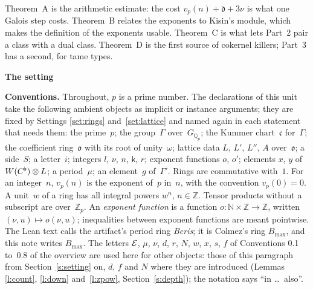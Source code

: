 \documentclass[11pt,a4paper]{article}
\newcommand{\kw}[1]{\emph{#1}}
\newcommand{\m}[1]{\mbox{$#1$}}        %
\newcommand{\sect}[2]{\refstepcounter{section}\label{#2}\par\addvspace{19pt plus 4pt minus 2pt}\Needspace{7\baselineskip}%
  \noindent\llap{{\fontsize{13.2}{16}\selectfont\bfseries\color{inkfaint}\thesection}\hspace{9pt}}%
  {\fontsize{13.2}{16}\selectfont\bfseries\color{ink}#1}\par\nopagebreak\vspace{-1pt}}
\theoremstyle{plainx}
\theoremstyle{uprightx}
\newenvironment{conventions}{\par\addvspace{5pt}\noindent\textbf{Conventions.}\enspace\ignorespaces}{\par\addvspace{3pt}}
\providecommand{\Zp}{\mathbb{Z}_p}\providecommand{\Qp}{\mathbb{Q}_p}\providecommand{\GQp}{G_{\mathbb{Q}_p}}
\providecommand{\fo}{\mathfrak{o}}\providecommand{\fc}{\mathfrak{c}}\providecommand{\fd}{\mathfrak{d}}
\begin{document}
Theorem~A is the arithmetic estimate: the cost \m{v_p(n)+\fd+3\nu} is what one Galois step costs. Theorem~B relates
the exponents to Kisin's module, which makes the definition of the exponents usable. Theorem~C is
what lets Part~2 pair a class with a dual class. Theorem~D is the first source of cokernel killers; Part~3 has a
second, for tame types.

\sect{The setting}{s:setting}
\begin{conventions}\label{c:conventions}
Throughout, $p$ is a prime number. The declarations of this unit take the following ambient objects as implicit or
instance arguments; they are fixed by Settings \ref{set:rings} and~\ref{set:lattice} and named again in each
statement that needs them: the prime~$p$; the group~$\Gamma$ over~$\GQp$; the Kummer chart~$\fc$ for~$\Gamma$; the
coefficient ring~$\fo$ with its root of unity~$\omega$; lattice data $L$, $L'$, $L''$, $A$ over~$\fo$; a side~$S$; a
letter~$i$; integers $l$, $\nu$, $n$, $\mathsf{k}$, $r$; exponent functions $o$, $o'$; elements $x$, $y$ of
\m{\WC\otimes L}; a period~$\mu$; an element~$g$ of~$\Gamma'$. Rings are commutative with~$1$. For an
integer~$n$, \m{v_p(n)} is the exponent of~$p$ in~$n$, with the convention \m{v_p(0)=0}. A unit~$w$ of a ring
has all integral powers \m{w^{n}}, \m{n\in\mathbb{Z}}. Tensor products without a subscript are over~$\Zp$. An
\kw{exponent function} is a function $o\colon\mathbb{N}\times\mathbb{Z}\to\mathbb{Z}$, written
\m{(\nu,u)\mapsto o(\nu,u)}; inequalities between exponent functions are meant pointwise. The Lean text calls
the artifact's period ring \emph{Bcris}; it is Colmez's ring $B_{\max}$, and this note writes $B_{\max}$. The letters $\mathcal{E}$, $\mu$, $\nu$, $d$, $r$, $N$, $w$, $x$, $s$, $f$ of Conventions 0.1 to~0.8 of the
overview are used here for other objects: those of this paragraph from Section~\ref{s:setting} on, $d$, $f$ and $N$ where they
are introduced (Lemmas \ref{l:count}, \ref{l:down} and~\ref{l:zpow}, Section~\ref{s:depth}); the notation says ``in \dots\ also''.
\end{conventions}
\end{document}
